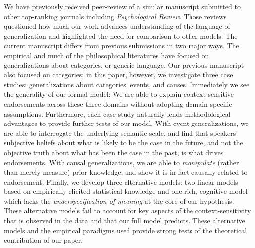 \documentclass[11pt,letterpaper]{letter} %
\begin{document}
\begin{letter}
We have previously received peer-review of a similar manuscript submitted to other top-ranking journals including \emph{Psychological Review}.
Those reviews questioned how much our work advances understanding of the language of generalization and highlighted the need for comparison to other models. 
The current manuscript differs from previous submissions in two major ways.
The empirical and much of the philosophical literatures have focused on generalizations about categories, or generic language.
Our previous manuscript also focused on categories; in this paper, however, we investigate three case studies: generalizations about categories, events, and causes. 
Immediately we see the generality of our formal model: We are able to explain context-sensitive endorsements across these three domains without adopting domain-specific assumptions.
Furthermore, each case study naturally lends methodological advantages to provide further tests of our model.
With event generalizations, we are able to interrogate the underlying semantic scale, and find that speakers' subjective beliefs about what is likely to be the case in the future, and not the objective truth about what has been the case in the past, is what drives endorsements. 
With causal generalizations, we are able to \emph{manipulate} (rather than merely measure) prior knowledge, and show it is in fact causally related to endorsement. 
Finally, we develop three alternative models: two linear models based on empirically-elicited statistical knowledge and one rich, cognitive model which lacks the \emph{underspecification of meaning} at the core of our hypothesis. 
These alternative models fail to account for key aspects of the context-sensitivity that is observed in the data and that our full model predicts.
These alternative models and the empirical paradigms used provide strong tests of the theoretical contribution of our paper. 




\end{letter}
\end{document}

